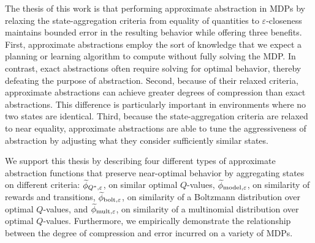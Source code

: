 

The thesis of this work is that performing approximate abstraction in \acp{MDP} by relaxing the state-aggregation criteria from equality of quantities to $\varepsilon$-closeness maintains bounded error in the resulting behavior while offering three benefits. First, approximate abstractions employ the sort of knowledge that we expect a planning or learning algorithm to compute without fully solving the \ac{MDP}. In contrast, exact abstractions often require solving for optimal behavior, thereby defeating the purpose of abstraction. Second, because of their relaxed criteria, approximate abstractions can achieve greater degrees of compression than exact abstractions. This difference is particularly important in environments where no two states are identical. Third, because the state-aggregation criteria are relaxed to near equality, approximate abstractions are able to tune the aggressiveness of abstraction by adjusting what they consider sufficiently similar states. 

We support this thesis by describing four different types of approximate abstraction functions that preserve near-optimal behavior by aggregating states on different criteria: $\widetilde \phi_{Q^*,\varepsilon}$, on similar optimal $Q$-values, $\widetilde \phi_{\text{model},\varepsilon}$, on similarity of rewards and transitions, $\widetilde \phi_{\text{bolt},\varepsilon}$, on similarity of a Boltzmann distribution over optimal $Q$-values, and $\widetilde \phi_{\text{mult},\varepsilon}$, on similarity of a multinomial distribution over optimal $Q$-values. Furthermore, we empirically demonstrate the relationship between the degree of compression and error incurred on a variety of \acp{MDP}.

